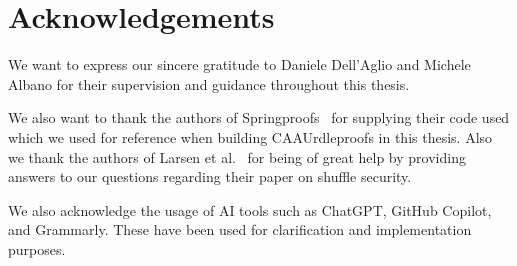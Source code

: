 

\section{Acknowledgements}\label{sec:acknowledgements}
We want to express our sincere gratitude to Daniele Dell'Aglio and Michele Albano for their supervision and guidance throughout this thesis.

We also want to thank the authors of Springproofs~\cite{zhang2024springproofs} for supplying their code used which we used for reference when building CAAUrdleproofs in this thesis.
Also we thank the authors of Larsen et al.~\cite{cryptoeprint:2022/560} for being of great help by providing answers to our questions regarding their paper on shuffle security.

We also acknowledge the usage of AI tools such as ChatGPT, GitHub Copilot, and Grammarly.
These have been used for clarification and implementation purposes.